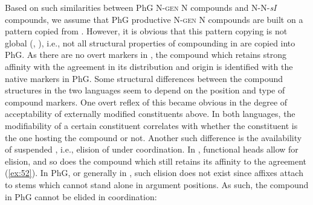 \documentclass[output=paper]{LSP/langsci}
\begin{document}
Based on such similarities between PhG N-\textsc{gen} N compounds and  N-N-\textit{sI} compounds, we assume that PhG productive N-\textsc{gen} N  compounds are built on a pattern copied from . However, it is obvious that this pattern copying is not global (\citealt{Johanson1992}, \citealt[201--202]{Johanson1993}), i.e., not all structural properties of compounding in  are copied into PhG. As there are no overt  markers in , the  compound  which retains strong affinity with the  agreement  in its distribution and origin is identified with the native  markers in PhG. Some structural differences between the compound structures in the two languages seem to depend on the position and type of compound markers. One overt reflex of this became obvious in the degree of acceptability of externally modified constituents above. In both languages, the modifiability of a certain constituent correlates with whether the constituent is the one hosting the compound  or not. Another such difference is the availability of suspended , i.e.,  elision of  under coordination. In , functional heads allow for elision, and so does the compound  which still retains its affinity to the  agreement  (\ref{ex:52}). In PhG, or generally in , such elision does not exist since affixes attach to stems which cannot stand alone in argument positions. As such, the compound  in PhG cannot be elided in coordination:
\z                                   
\end{document}
